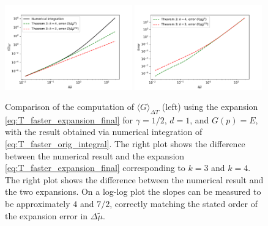 \documentclass[sn-mathphys,Numbered]{sn-jnl}
\begin{document}

\begin{figure}[t]
\centering
\includegraphics[width=0.49\textwidth]{./plot/FD_avg_expansion_comparison_T_decay_faster.pdf}
\includegraphics[width=0.49\textwidth]{./plot/FD_avg_expansion_error_comparison_T_decay_faster.pdf}
\caption{Comparison of the computation of $\langle G\rangle_{\Delta T}$   (left) using the expansion \eqref{eq:T_faster_expansion_final} for $\gamma=1/2$, $d=1$, and $G(p)=E$, with the result obtained via numerical integration of \eqref{eq:T_faster_orig_integral}. The right plot shows the difference between the numerical result and the expansion \eqref{eq:T_faster_expansion_final} corresponding to $k=3$ and $k=4$.  The right plot shows the difference between the numerical result and the two expansions.  On a log-log plot  the slopes can be measured to be approximately $4$ and $7/2$, correctly matching the stated order of the expansion error in $\Delta\widetilde{\mu}$.}\label{fig:T_faster_expansion_comparison}
\end{figure}
\end{document}
